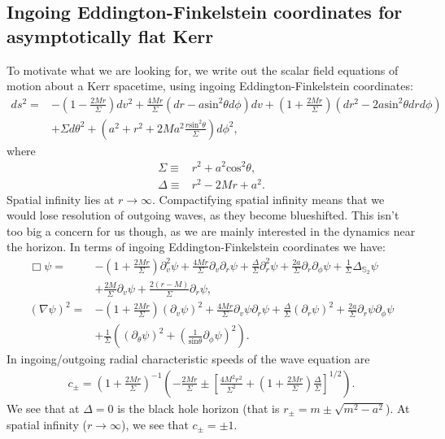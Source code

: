 \documentclass[%
 prd,
amsmath,amssymb,
preprint,%
]{revtex4-1}
\begin{document}
\subsection{\label{sec:ief}
   Ingoing Eddington-Finkelstein coordinates for asymptotically flat Kerr
   }
To motivate what we are looking for, we write out the scalar
field equations of motion about a Kerr spacetime, using
ingoing Eddington-Finkelstein coordinates:
\begin{align}
   ds^2
   =&
   -
   \left(1-\frac{2Mr}{\Sigma}\right)dv^2
   +
   \frac{4Mr}{\Sigma}\left(dr-a\mathrm{sin}^2\theta d\phi\right)dv
   +
   \left(1+\frac{2Mr}{\Sigma}\right)\left(
      dr^2-2a\mathrm{sin}^2\theta dr d\phi
   \right)
   \nonumber\\&
   +
   \Sigma d\theta^2
   +
   \left(
      a^2+r^2+2Ma^2\frac{r\mathrm{sin}^2\theta}{\Sigma}
   \right)
   d\phi^2
   ,
\end{align}
where
\begin{subequations}
\begin{align}
   \Sigma
   \equiv&
   r^2+a^2\mathrm{cos}^2\theta
   ,\\
   \Delta
   \equiv&
   r^2-2Mr+a^2
   .
\end{align}
\end{subequations}
Spatial infinity lies at $r\to\infty$. Compactifying spatial infinity
means that we would lose resolution of outgoing waves,
as they become blueshifted.
This isn't too big a concern for us though, as we are mainly
interested in the dynamics near the horizon.
In terms of ingoing Eddington-Finkelstein coordinates we have:
\begin{align}
   \Box\psi
   =&
   -
   \left(1+\frac{2Mr}{\Sigma}\right)\partial_v^2\psi
   +
   \frac{4Mr}{\Sigma}\partial_v\partial_r\psi
   +
   \frac{\Delta}{\Sigma}\partial_r^2\psi
   +
   \frac{2a}{\Sigma}\partial_r\partial_{\phi}\psi
   +
   \frac{1}{\Sigma}\Delta_{\mathbb{S}_2}\psi
   \nonumber\\&
   +
   \frac{2M}{\Sigma}\partial_v\psi
   +
   \frac{2\left(r-M\right)}{\Sigma}\partial_r\psi
   ,\\
   \left(\nabla\psi\right)^2
   =&
   -
   \left(1+\frac{2Mr}{\Sigma}\right)\left(\partial_v\psi\right)^2
   +
   \frac{4Mr}{\Sigma}\partial_v\psi\partial_r\psi
   +
   \frac{\Delta}{\Sigma}\left(\partial_r\psi\right)^2
   +
   \frac{2a}{\Sigma}\partial_r\psi\partial_{\phi}\psi
   \nonumber\\&
   +
   \frac{1}{\Sigma}
   \left(
      \left(\partial_{\theta}\psi\right)^2
      +
      \left(\frac{1}{\mathrm{sin}\theta}\partial_{\phi}\psi\right)^2
   \right)
   .
\end{align}
In ingoing/outgoing radial characteristic speeds of the
wave equation are
\begin{align}
   c_{\pm}
   =
   \left(1+\frac{2Mr}{\Sigma}\right)^{-1}
   \left(
   -  \frac{2Mr}{\Sigma}
      \pm
      \left[
         \frac{4M^2r^2}{\Sigma^2}
      +  \left(1+\frac{2Mr}{\Sigma}\right)\frac{\Delta}{\Sigma}
      \right]^{1/2}
   \right)
   .
\end{align}
We see that at $\Delta=0$ is the black hole horizon
(that is $r_{\pm}=m\pm\sqrt{m^2-a^2}$).
At spatial infinity ($r\to\infty$), we see that $c_{\pm}=\pm1$.
\end{document}
